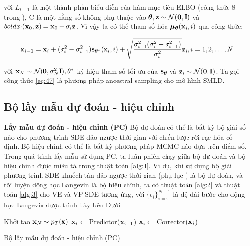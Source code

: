 \documentclass{article} %
\begin{document}
với $L_{t-1}$ là một thành phần biểu diễn của hàm mục tiêu ELBO (công thức 8 trong \citep{ho2020denoising}), C là một hằng số không phụ thuộc vào $\boldsymbol{\theta}, \bold{z} \sim \mathcal{N}(\bold{0}, \bold{I})$ và $bold{x}_i (\bold{x}_0, \bold{z})=\bold{x}_0 + \sigma_i \bold{z}$.
Vì vậy ta có thể tham số hóa $\boldsymbol{\mu}_{\boldsymbol{\theta}}(\bold{x}_i, i)$ qua công thức:

\begin{equation} \label{eq:47}
    \bold{x}_{i-1} = \bold{x}_i + (\sigma_i^2 - \sigma_{i-1}^2) \bold{s}_{\boldsymbol{\theta}^{\ast}} (\bold{x}_i, i) + \sqrt{\dfrac{\sigma_{i-1}^2 (\sigma_i^2 - \sigma_{i-1}^2)}{\sigma_i^2}} \bold{z}_i, i = 1, 2, \dots, N
\end{equation}

với $\bold{x}_N \sim \mathcal{N}(\bold{0}, \sigma_N^2 \bold{I}), \bold{\theta}^{\ast}$ ký hiệu tham số tối ưu của $\bold{s}_{\boldsymbol{\theta}}$ và $\bold{z}_i \sim \mathcal{N}(\bold{0}, \bold{I})$.
Ta gọi công thức \ref{eq:47} là phương pháp ancestral sampling cho mô hình SMLD.

\subsection{Bộ lấy mẫu dự đoán - hiệu chỉnh} \label{G}

\textbf{Lấy mẫu dự đoán - hiệu chỉnh (PC)} Bộ dự đoán có thể là bất kỳ bộ giải số nào cho phương trình SDE đảo ngược thời gian với chiến lược rời rạc hóa cố định.
Bộ hiệu chỉnh có thể là bất kỳ phương pháp MCMC nào dựa trên điểm số.
Trong quá trình lấy mẫu sử dụng PC, ta luân phiên chạy giữa bộ dự đoán và bộ hiệu chỉnh được miêu tả trong thuật toán \ref{alg:1}.
Ví dụ, khi sử dụng bộ giải phương trình SDE khuếch tán đảo ngược thời gian (phụ lục ) là bộ dự đoán, và tôi luyện động học Langevin \citep{song2019generative} là bộ hiệu chỉnh, ta có thuật toán \ref{alg:2} và thuật toán \ref{alg:3} cho VE và VP SDE tương ứng,
với $\lbrace \epsilon_i \rbrace_{i=0}^{N-1}$ là độ dài bước cho động học Langevin được trình bày bên Dưới

\begin{algorithm}[h!]
    \DontPrintSemicolon
    Khởi tạo $\bold{x}_N \sim p_T(\bold{x})$\;
     {
        $\bold{x}_i \gets$ Predictor($\bold{x}_{i+1}$)\;
         {
            $\bold{x}_i \gets$ Corrector($\bold{x}_i$)\;
        }
    }
    \;
    \caption{Bộ lấy mẫu dự đoán - hiệu chỉnh (PC)}
    \label{alg:1}
\end{algorithm}
\end{document}
